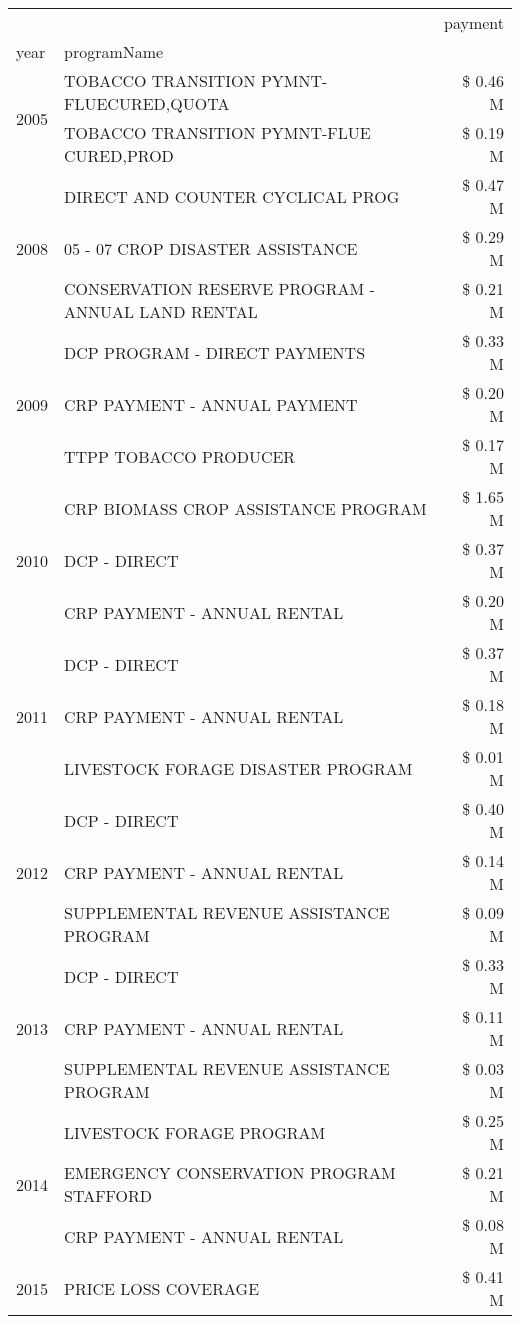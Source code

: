 \begin{tabular}{llr}
\toprule
 &  & payment \\
year & programName &  \\
\midrule
\multirow[t]{2}{*}{2005} & TOBACCO TRANSITION PYMNT-FLUECURED,QUOTA & \$ 0.46 M \\
 & TOBACCO TRANSITION PYMNT-FLUE CURED,PROD & \$ 0.19 M \\
\cline{1-3}
\multirow[t]{3}{*}{2008} & DIRECT AND COUNTER CYCLICAL PROG & \$ 0.47 M \\
 & 05 - 07 CROP DISASTER ASSISTANCE & \$ 0.29 M \\
 & CONSERVATION RESERVE PROGRAM - ANNUAL LAND RENTAL & \$ 0.21 M \\
\cline{1-3}
\multirow[t]{3}{*}{2009} & DCP PROGRAM - DIRECT PAYMENTS & \$ 0.33 M \\
 & CRP PAYMENT - ANNUAL PAYMENT & \$ 0.20 M \\
 & TTPP TOBACCO PRODUCER & \$ 0.17 M \\
\cline{1-3}
\multirow[t]{3}{*}{2010} & CRP BIOMASS CROP ASSISTANCE PROGRAM & \$ 1.65 M \\
 & DCP - DIRECT & \$ 0.37 M \\
 & CRP PAYMENT - ANNUAL RENTAL & \$ 0.20 M \\
\cline{1-3}
\multirow[t]{3}{*}{2011} & DCP - DIRECT & \$ 0.37 M \\
 & CRP PAYMENT - ANNUAL RENTAL & \$ 0.18 M \\
 & LIVESTOCK FORAGE DISASTER PROGRAM & \$ 0.01 M \\
\cline{1-3}
\multirow[t]{3}{*}{2012} & DCP - DIRECT & \$ 0.40 M \\
 & CRP PAYMENT - ANNUAL RENTAL & \$ 0.14 M \\
 & SUPPLEMENTAL REVENUE ASSISTANCE PROGRAM & \$ 0.09 M \\
\cline{1-3}
\multirow[t]{3}{*}{2013} & DCP - DIRECT & \$ 0.33 M \\
 & CRP PAYMENT - ANNUAL RENTAL & \$ 0.11 M \\
 & SUPPLEMENTAL REVENUE ASSISTANCE PROGRAM & \$ 0.03 M \\
\cline{1-3}
\multirow[t]{3}{*}{2014} & LIVESTOCK FORAGE PROGRAM & \$ 0.25 M \\
 & EMERGENCY CONSERVATION PROGRAM STAFFORD & \$ 0.21 M \\
 & CRP PAYMENT - ANNUAL RENTAL & \$ 0.08 M \\
\cline{1-3}
\multirow[t]{3}{*}{2015} & PRICE LOSS COVERAGE & \$ 0.41 M \\

\end{tabular}
